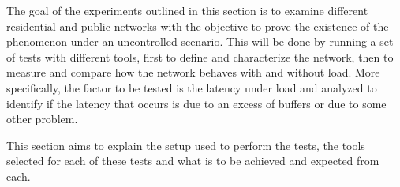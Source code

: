 The goal of the experiments outlined in this section is to examine different
residential and public networks with the objective to prove the existence of the
phenomenon under an uncontrolled scenario. This will be done by running a set of
tests with different tools, first to define and characterize the network, then
to measure and compare how the network behaves with and without load. More
specifically, the factor to be tested is the latency under load and analyzed to
identify if the latency that occurs is due to an excess of buffers or due to
some other problem.

This section aims to explain the setup used to perform the tests,
the tools selected for each of these tests and what is to be achieved and 
expected from each.
